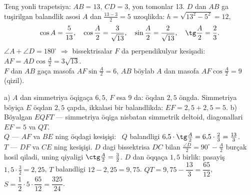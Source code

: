 \newpage
{}
Teng yonli trapetsiya: $AB=13$, $CD=3$, yon tomonlar 13. $D$ dan $AB$ ga tuşirilgan balandlik asosi $A$ dan $\frac{13-3}2=5$ uzoqlikda:
$h=\sqrt{13^2-5^2}=12$, \[\cos A=\frac5{13},\quad \cos\frac A2=\frac3{\sqrt{13}},\quad\sin\frac A2=\frac2{\sqrt{13}},\quad\tg\frac A2=\frac23.\]
$\angle A+\angle D=180^\circ$ $\Rightarrow$ bissektrisalar $F$ da perpendikulyar kesişadi: $AF=AD\cos\frac A2=3\sqrt{13}$.\\
$F$ dan $AB$ gaça masofa $AF\sin\frac A2=6$, $AB$ böylab $A$ dan masofa $AF\cos\frac A2=9$ (\textcolor{aux}{qizil}).

a) $A$ dan simmetriya öqigaça $6{,}5$, $F$ esa $9$ da: öqdan $2{,}5$ öngda. Simmetriya böyiça $E$ öqdan $2{,}5$ çapda, ikkalasi bir balandlikda:
$EF=2{,}5+2{,}5=5$.
b) Böyalgan $EQFT$ — simmetriya öqiga nisbatan simmetrik deltoid, diagonallari $EF=5$ va $QT$.\\
$Q$ — $AF$ va $BE$ ning öqdagi kesişişi: \ $Q$ balandligi $6{,}5\cdot\tg\frac A2=6{,}5\cdot\frac23=\frac{13}3$.\\
$T$ — $DF$ va $CE$ ning kesişişi. $D$ dagi bissektrisa $DC$ bilan $\frac{\angle D}2=90^\circ-\frac A2$ burçak hosil qiladi, uning qiyaligi $\ctg\frac A2=\frac32$. $D$ dan öqqaça $1{,}5$ birlik: pasayiş $1{,}5\cdot\frac32=2{,}25$, $T$ balandligi $12-2{,}25=9{,}75$.
$QT=9{,}75-\dfrac{13}3=\dfrac{65}{12}$, \quad $S=\dfrac12\cdot5\cdot\dfrac{65}{12}=\dfrac{325}{24}$.


